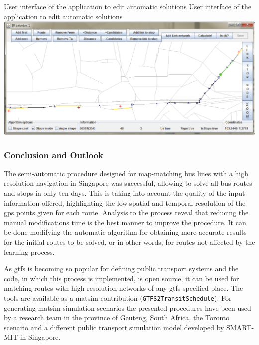 \createfigure
{User interface of the application to edit automatic solutions}
{User interface of the application to edit automatic solutions}
{\label{fig:Application}}
{\includegraphics[width=1.0\textwidth]{extending/figures/semiAuto/Application.png}}
{}

\subsubsection{Conclusion and Outlook}
The semi-automatic procedure designed for map-matching bus lines with a high resolution navigation in Singapore was successful, allowing to solve all bus routes and stops in only ten days. This is taking into account the quality of the input information offered, highlighting the low spatial and temporal resolution of the \gls{gps} points given for each route. Analysis to the process reveal that reducing the manual modifications time is the best manner to improve the procedure. It can be done modifying the automatic algorithm for obtaining more accurate results for the initial routes to be solved, or in other words, for routes not affected by the learning process.

As \gls{gtfs} is becoming so popular for defining public transport systems and the code, in which this process is implemented, is open source, it can be used for matching routes with high resolution networks of any \gls{gtfs}-specified place. The tools are available as a \gls{matsim} \gls{contribution} (\lstinline|GTFS2TransitSchedule|). For generating \gls{matsim} simulation scenarios the presented procedures have been used by a research team in the province of Gauteng, South Africa, the Toronto scenario and a different public transport simulation model developed by SMART-MIT in Singapore.


